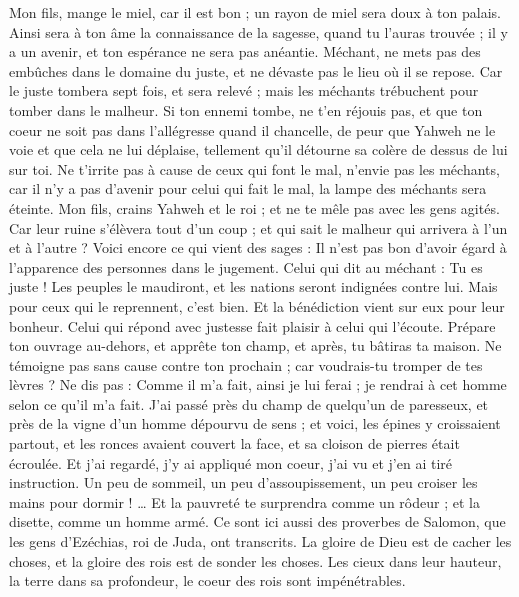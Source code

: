 \begin{multicols}{2}
Mon fils, mange le miel, car il est bon ; un rayon de miel sera doux à ton palais.
Ainsi sera à ton âme la connaissance de la sagesse, quand tu l'auras trouvée ; il y a un avenir, et ton espérance ne sera pas anéantie.
Méchant, ne mets pas des embûches dans le domaine du juste, et ne dévaste pas le lieu où il se repose.
Car le juste tombera sept fois, et sera relevé ; mais les méchants trébuchent pour tomber dans le malheur.
Si ton ennemi tombe, ne t'en réjouis pas, et que ton coeur ne soit pas dans l’allégresse quand il chancelle,
de peur que Yahweh ne le voie et que cela ne lui déplaise, tellement qu'il détourne sa colère de dessus de lui sur toi.
Ne t’irrite pas à cause de ceux qui font le mal, n'envie pas les méchants,
car il n'y a pas d’avenir pour celui qui fait le mal, la lampe des méchants sera éteinte.
Mon fils, crains Yahweh et le roi ; et ne te mêle pas avec les gens agités.
Car leur ruine s'élèvera tout d'un coup ; et qui sait le malheur qui arrivera à l’un et à l’autre ?
Voici encore ce qui vient des sages : Il n'est pas bon d'avoir égard à l'apparence des personnes dans le jugement.
Celui qui dit au méchant : Tu es juste ! Les peuples le maudiront, et les nations seront indignées contre lui.
Mais pour ceux qui le reprennent, c’est bien. Et la bénédiction vient sur eux pour leur bonheur.
Celui qui répond avec justesse fait plaisir à celui qui l'écoute.
Prépare ton ouvrage au-dehors, et apprête ton champ, et après, tu bâtiras ta maison.
Ne témoigne pas sans cause contre ton prochain ; car voudrais-tu tromper de tes lèvres ?
Ne dis pas : Comme il m'a fait, ainsi je lui ferai ; je rendrai à cet homme selon ce qu'il m'a fait.
J'ai passé près du champ de quelqu’un de paresseux, et près de la vigne d'un homme dépourvu de sens ;
et voici, les épines y croissaient partout, et les ronces avaient couvert la face, et sa cloison de pierres était écroulée.
Et j’ai regardé, j’y ai appliqué mon coeur, j’ai vu et j’en ai tiré instruction.
Un peu de sommeil, un peu d’assoupissement, un peu croiser les mains pour dormir ! …
Et la pauvreté te surprendra comme un rôdeur ; et la disette, comme un homme armé.
\VerseOne{}Ce sont ici aussi des proverbes de Salomon, que les gens d'Ezéchias, roi de Juda, ont transcrits.
La gloire de Dieu est de cacher les choses, et la gloire des rois est de sonder les choses.
Les cieux dans leur hauteur, la terre dans sa profondeur, le coeur des rois sont impénétrables.

\end{multicols}
